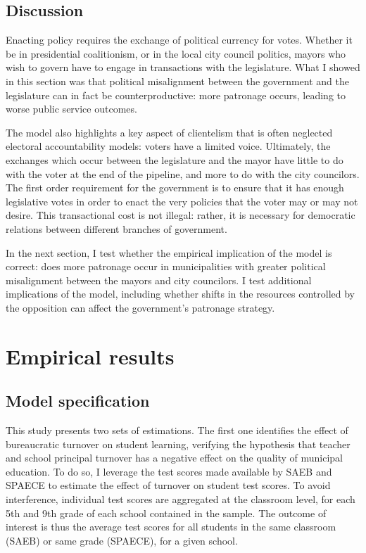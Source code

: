 \documentclass[12pt,a4paper]{article}
\begin{document}
\subsection*{Discussion}

Enacting policy requires the exchange of political currency for votes. Whether it be in presidential coalitionism, or in the local city council politics, mayors who wish to govern have to engage in transactions with the legislature. What I showed in this section was that political misalignment between the government and the legislature can in fact be counterproductive: more patronage occurs, leading to worse public service outcomes.

The model also highlights a key aspect of clientelism that is often neglected electoral accountability models: voters have a limited voice. Ultimately, the exchanges which occur between the legislature and the mayor have little to do with the voter at the end of the pipeline, and more to do with the city councilors. The first order requirement for the government is to ensure that it has enough legislative votes in order to enact the very policies that the voter may or may not desire. This transactional cost is not illegal: rather, it is necessary for democratic relations between different branches of government.

In the next section, I test whether the empirical implication of the model is correct: does more patronage occur in municipalities with greater political misalignment between the mayors and city councilors. I test additional implications of the model, including whether shifts in the resources controlled by the opposition can affect the government's patronage strategy.

\section{Empirical results}

\subsection*{Model specification}

This study presents two sets of estimations. The first one identifies the effect of bureaucratic turnover on student learning, verifying the hypothesis that teacher and school principal turnover has a negative effect on the quality of municipal education. To do so, I leverage the test scores made available by SAEB and SPAECE to estimate the effect of turnover on student test scores. To avoid interference, individual test scores are aggregated at the classroom level, for each 5th and 9th grade of each school contained in the sample. The outcome of interest is thus the average test scores for all students in the same classroom (SAEB) or same grade (SPAECE), for a given school.
\end{document}
